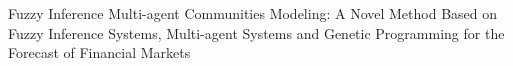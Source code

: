 Fuzzy Inference Multi-agent Communities Modeling: A Novel Method Based on Fuzzy Inference Systems, Multi-agent Systems and Genetic Programming for the Forecast of Financial Markets
    
    
  
  
  
  
  
  